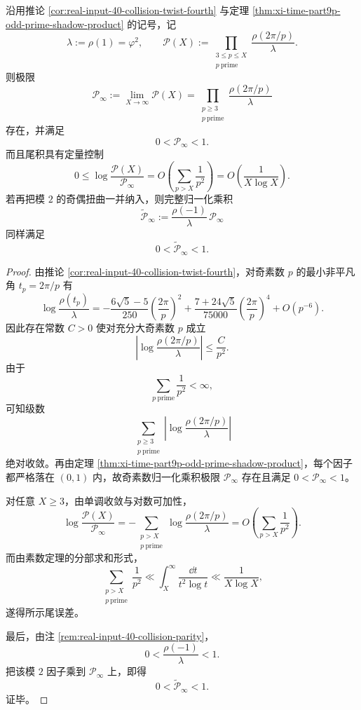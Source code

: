 \begin{theorem}[素数模最小扭曲的归一化乘积极限与尾误差]\label{thm:derived-collision-prime-twist-normalized-product}
沿用推论 \ref{cor:real-input-40-collision-twist-fourth} 与定理 \ref{thm:xi-time-part9p-odd-prime-shadow-product} 的记号，记
\[
\lambda:=\rho(1)=\varphi^2,
\qquad
\mathcal P(X):=\prod_{\substack{3\le p\le X\\ p\ \mathrm{prime}}}\frac{\rho(2\pi/p)}{\lambda}.
\]
则极限
\[
\mathcal P_\infty
:=
\lim_{X\to\infty}\mathcal P(X)
=
\prod_{\substack{p\ge 3\\ p\ \mathrm{prime}}}\frac{\rho(2\pi/p)}{\lambda}
\]
存在，并满足
\[
0<\mathcal P_\infty<1.
\]
而且尾积具有定量控制
\[
0\le
\log\frac{\mathcal P(X)}{\mathcal P_\infty}
=
O\!\left(\sum_{p>X}\frac1{p^2}\right)
=
O\!\left(\frac1{X\log X}\right).
\]
若再把模 \(2\) 的奇偶扭曲一并纳入，则完整归一化乘积
\[
\widetilde{\mathcal P}_\infty
:=
\frac{\rho(-1)}{\lambda}\,\mathcal P_\infty
\]
同样满足
\[
0<\widetilde{\mathcal P}_\infty<1.
\]
\end{theorem}
\begin{proof}
由推论 \ref{cor:real-input-40-collision-twist-fourth}，对奇素数 \(p\) 的最小非平凡角 \(t_p=2\pi/p\) 有
\[
\log\frac{\rho(t_p)}{\lambda}
=
-\frac{6\sqrt5-5}{250}\left(\frac{2\pi}{p}\right)^2
+\frac{7+24\sqrt5}{75000}\left(\frac{2\pi}{p}\right)^4
+O\!\left(p^{-6}\right).
\]
因此存在常数 \(C>0\) 使对充分大奇素数 \(p\) 成立
\[
\left|\log\frac{\rho(2\pi/p)}{\lambda}\right|\le \frac{C}{p^2}.
\]
由于
\[
\sum_{p\ \mathrm{prime}}\frac1{p^2}<\infty,
\]
可知级数
\[
\sum_{\substack{p\ge 3\\ p\ \mathrm{prime}}}\left|\log\frac{\rho(2\pi/p)}{\lambda}\right|
\]
绝对收敛。再由定理 \ref{thm:xi-time-part9p-odd-prime-shadow-product}，每个因子都严格落在 \((0,1)\) 内，故奇素数归一化乘积极限 \(\mathcal P_\infty\) 存在且满足 \(0<\mathcal P_\infty<1\)。

对任意 \(X\ge 3\)，由单调收敛与对数可加性，
\[
\log\frac{\mathcal P(X)}{\mathcal P_\infty}
=
-\sum_{\substack{p>X\\ p\ \mathrm{prime}}}
\log\frac{\rho(2\pi/p)}{\lambda}
=
O\!\left(\sum_{p>X}\frac1{p^2}\right).
\]
而由素数定理的分部求和形式，
\[
\sum_{\substack{p>X\\ p\ \mathrm{prime}}}\frac1{p^2}
\ll
\int_X^\infty \frac{\dd t}{t^2\log t}
\ll
\frac1{X\log X},
\]
遂得所示尾误差。

最后，由注 \ref{rem:real-input-40-collision-parity}，
\[
0<\frac{\rho(-1)}{\lambda}<1.
\]
把该模 \(2\) 因子乘到 \(\mathcal P_\infty\) 上，即得
\[
0<\widetilde{\mathcal P}_\infty<1.
\]
证毕。
\end{proof}
